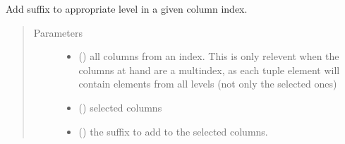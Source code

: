 \documentclass[letterpaper,10pt,english]{sphinxmanual}
\begin{document}
\begin{fulllineitems}
\label{\detokenize{dalio.util:dalio.util.add_suffix}}
Add suffix to appropriate level in a given column index.
\begin{quote}\begin{description}
\item[{Parameters}] \leavevmode\begin{itemize}
\item {} 
 (\sphinxstyleliteralemphasis{\sphinxupquote{, }}) \textendash{} all columns from an index. This
is only relevent when the columns at hand are a multindex, as each
tuple element will contain elements from all levels (not only the
selected ones)

\item {} 
 (\sphinxstyleliteralemphasis{\sphinxupquote{, }}\sphinxstyleliteralemphasis{\sphinxupquote{, }}) \textendash{} selected columns

\item {} 
 () \textendash{} the suffix to add to the selected columns.

\end{itemize}

\end{description}\end{quote}

\end{fulllineitems}

\end{document}
